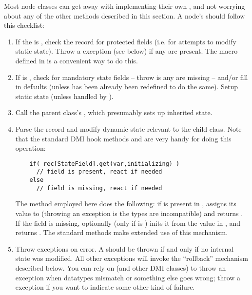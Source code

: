   Most node classes can get away with implementing their own
  , and not worrying about any of the other methods
  described in this section. A node's  should follow this
  checklist:

  \begin{enumerate}

  \item If the  is , check the record for protected
    fields (i.e. for attempts to modify static state). Throw a
     exception (see below) if any are present. The
     macro defined in  is a
    convenient way to do this.
    
  \item If  is , check for mandatory state fields --
    throw  is any are missing -- and/or fill in defaults
    (unless  has been already been redefined to do the
    same). Setup static state (unless handled by ).

  \item Call the parent class's , which presumably sets up
    inherited state.

  \item Parse the record and modify dynamic state relevant to the child class.
    Note that the standard DMI hook methods  and  
    are very handy for doing this operation:

    \begin{verbatim}
    if( rec[StateField].get(var,initializing) )
      // field is present, react if needed
    else
      // field is missing, react if needed
    \end{verbatim}
    
    The  method employed here does the following: if 
    is present in , assigns its value to  (throwing an
    exception is the types are incompatible) and returns . If the
    field is missing, optionally (only if  is ) inits
    it from the value in , and returns . The standard
     methods make extended use of this mechanism.
    
  \item Throw exceptions on error. A  should be
    thrown if and only if no internal state was modified. All other exceptions
    will invoke the ``rollback'' mechanism described below. You can rely on
     (and other DMI classes) to throw an exception when
    datatypes mismatch or something else goes wrong; throw a
     exception if you want to indicate some other kind of
    failure.

  \end{enumerate}

